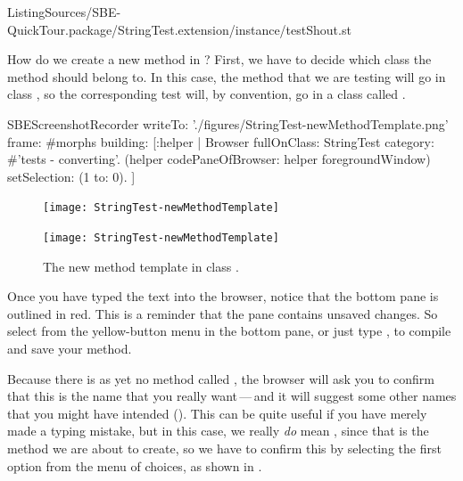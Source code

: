 \documentclass[a4paper,10pt,twoside]{book}
\begin{document}
%
{ListingSources/SBE-QuickTour.package/StringTest.extension/instance/testShout.st}

How do we create a new method in \sq?
First, we have to decide which class the method should belong to.
In this case, the  method that we are testing will go in class , so the corresponding test will, by convention, go in a class called .

\begin{ExecuteSmalltalkScript}
SBEScreenshotRecorder writeTo: './figures/StringTest-newMethodTemplate.png' frame: #morphs building: [:helper |
	Browser fullOnClass: StringTest category: #'tests - converting'.
	(helper codePaneOfBrowser: helper foregroundWindow) setSelection: (1 to: 0).
]
\end{ExecuteSmalltalkScript}


\begin{figure}[hbt]
\ifluluelse
	{\centerline {\texttt{[image: StringTest-newMethodTemplate]}}}
	{\centerline {\texttt{[image: StringTest-newMethodTemplate]}}}
\caption{The new method template in class .
\label{fig:newMethodTemplate}}
\end{figure}

Once you have typed the text into the browser, notice that the bottom pane is outlined in red.
This is a reminder that the pane contains unsaved changes.
So select  from the yellow-button menu in the bottom pane, or just type , to compile and save your method.

Because there is as yet no method called , the browser will ask you to confirm that this is the name that you really want\,---\,and it will suggest some other names that you might have intended ().
This can be quite useful if you have merely made a typing mistake, but in this case, we really \emph{do} mean , since that is the method we are about to create, so we have to confirm this by selecting the first option from the menu of choices, as shown in .
\end{document}
